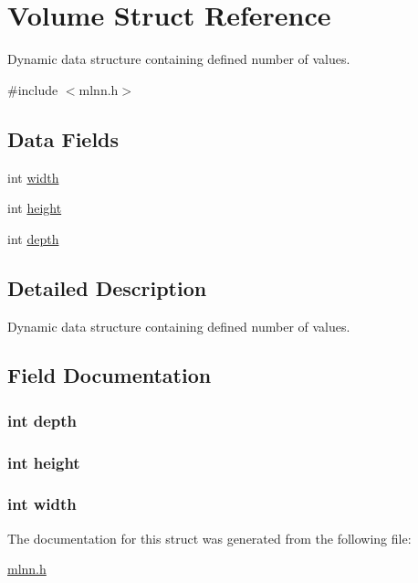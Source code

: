 \hypertarget{struct_volume}{}\section{Volume Struct Reference}
\label{struct_volume}


Dynamic data structure containing defined number of values.  




{\ttfamily \#include $<$mlnn.\+h$>$}

\subsection*{Data Fields}
\begin{DoxyCompactItemize}
\item 
int \hyperlink{struct_volume_a2474a5474cbff19523a51eb1de01cda4}{width}
\item 
int \hyperlink{struct_volume_ad12fc34ce789bce6c8a05d8a17138534}{height}
\item 
int \hyperlink{struct_volume_acb5ba97551079e0b072c62c21d784ac5}{depth}
\end{DoxyCompactItemize}


\subsection{Detailed Description}
Dynamic data structure containing defined number of values. 

\subsection{Field Documentation}
\hypertarget{struct_volume_acb5ba97551079e0b072c62c21d784ac5}{}
\subsubsection[{depth}]{\setlength{\rightskip}{0pt plus 5cm}int depth}\label{struct_volume_acb5ba97551079e0b072c62c21d784ac5}
\hypertarget{struct_volume_ad12fc34ce789bce6c8a05d8a17138534}{}
\subsubsection[{height}]{\setlength{\rightskip}{0pt plus 5cm}int height}\label{struct_volume_ad12fc34ce789bce6c8a05d8a17138534}
\hypertarget{struct_volume_a2474a5474cbff19523a51eb1de01cda4}{}
\subsubsection[{width}]{\setlength{\rightskip}{0pt plus 5cm}int width}\label{struct_volume_a2474a5474cbff19523a51eb1de01cda4}


The documentation for this struct was generated from the following file\+:\begin{DoxyCompactItemize}
\item 
\hyperlink{mlnn_8h}{mlnn.\+h}\end{DoxyCompactItemize}
